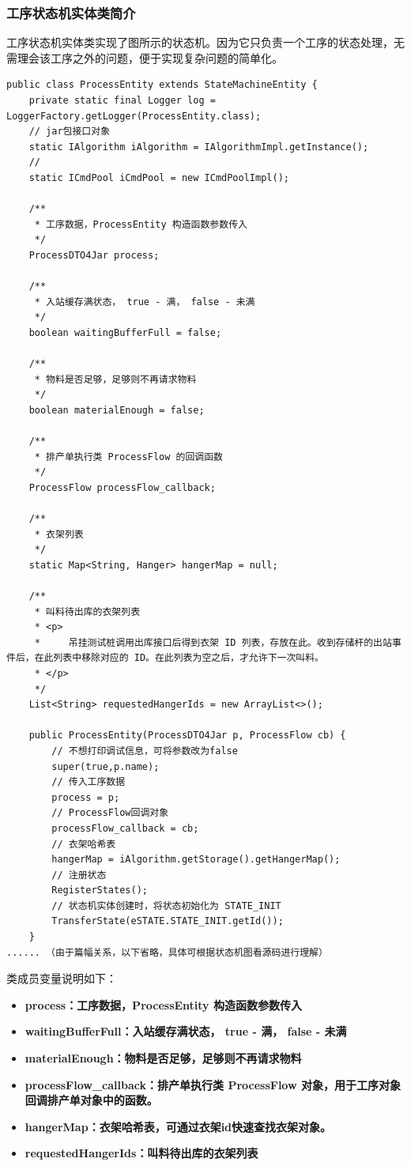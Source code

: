 \subsubsection{工序状态机实体类简介}
工序状态机实体类实现了图所示的状态机。因为它只负责一个工序的状态处理，无需理会该工序之外的问题，便于实现复杂问题的简单化。
\begin{lstlisting}
public class ProcessEntity extends StateMachineEntity {
    private static final Logger log = LoggerFactory.getLogger(ProcessEntity.class);
    // jar包接口对象
    static IAlgorithm iAlgorithm = IAlgorithmImpl.getInstance();
    //
    static ICmdPool iCmdPool = new ICmdPoolImpl();

    /**
     * 工序数据，ProcessEntity 构造函数参数传入
     */
    ProcessDTO4Jar process;

    /**
     * 入站缓存满状态， true - 满， false - 未满
     */
    boolean waitingBufferFull = false;

    /**
     * 物料是否足够，足够则不再请求物料
     */
    boolean materialEnough = false;

    /**
     * 排产单执行类 ProcessFlow 的回调函数
     */
    ProcessFlow processFlow_callback;

    /**
     * 衣架列表
     */
    static Map<String, Hanger> hangerMap = null;

    /**
     * 叫料待出库的衣架列表
     * <p>
     *     吊挂测试桩调用出库接口后得到衣架 ID 列表，存放在此。收到存储杆的出站事件后，在此列表中移除对应的 ID。在此列表为空之后，才允许下一次叫料。
     * </p>
     */
    List<String> requestedHangerIds = new ArrayList<>();

    public ProcessEntity(ProcessDTO4Jar p, ProcessFlow cb) {
        // 不想打印调试信息，可将参数改为false
        super(true,p.name);
        // 传入工序数据
        process = p;
        // ProcessFlow回调对象
        processFlow_callback = cb;
        // 衣架哈希表
        hangerMap = iAlgorithm.getStorage().getHangerMap();
        // 注册状态
        RegisterStates();
        // 状态机实体创建时，将状态初始化为 STATE_INIT
        TransferState(eSTATE.STATE_INIT.getId());
    }
...... （由于篇幅关系，以下省略，具体可根据状态机图看源码进行理解）
\end{lstlisting}\vspace{-30pt}
类成员变量说明如下：
\begin{itemize}
	\item \bf{process}：工序数据，ProcessEntity 构造函数参数传入
	\item \bf{waitingBufferFull}：入站缓存满状态， true - 满， false - 未满
	\item \bf{materialEnough}：物料是否足够，足够则不再请求物料
	\item \bf{processFlow\_callback}：排产单执行类 ProcessFlow 对象，用于工序对象回调排产单对象中的函数。
	\item \bf{hangerMap}：衣架哈希表，可通过衣架id快速查找衣架对象。
	\item \bf{requestedHangerIds}：叫料待出库的衣架列表
\end{itemize}

